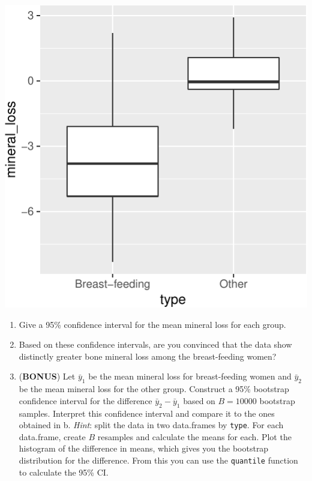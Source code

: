 \documentclass[letterpaper,9pt,twoside,printwatermark=false]{pinp}
\providecommand{\tightlist}{%
  \setlength{\itemsep}{0pt}\setlength{\parskip}{0pt}}
\begin{document}
\begin{center}\includegraphics{a4_clt_ci_files/figure-latex/unnamed-chunk-2-1} \end{center}

\begin{enumerate}
\def\labelenumi{\alph{enumi}.}
\tightlist
\item
  Give a 95\% confidence interval for the mean mineral loss for each
  group.
\item
  Based on these confidence intervals, are you convinced that the data
  show distinctly greater bone mineral loss among the breast-feeding
  women?
\item
  (\textbf{BONUS}) Let \(\bar{y}_1\) be the mean mineral loss for
  breast-feeding women and \(\bar{y}_2\) be the mean mineral loss for
  the other group. Construct a 95\% bootstrap confidence interval for
  the difference \(\bar{y}_2 - \bar{y}_1\) based on \(B=10000\)
  bootstrap samples. Interpret this confidence interval and compare it
  to the ones obtained in b. \emph{Hint}: split the data in two
  data.frames by \texttt{type}. For each data.frame, create \(B\)
  resamples and calculate the means for each. Plot the histogram of the
  difference in means, which gives you the bootstrap distribution for
  the difference. From this you can use the \texttt{quantile} function
  to calculate the 95\% CI.
\end{enumerate}
\end{document}
